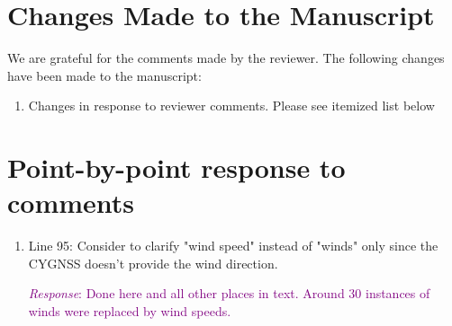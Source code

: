 \documentclass[10pt, letterpaper]{article}
\begin{document}


\section*{Changes Made to the Manuscript}

We are grateful for the comments made by the reviewer. The following changes have been made to the manuscript:

\begin{enumerate}
    \item Changes in response to reviewer comments. Please see itemized list below

\end{enumerate}

\section*{Point-by-point response to comments}

\begin{enumerate}

\item Line 95: Consider to clarify "wind speed" instead of "winds" only since the CYGNSS doesn't provide the wind direction.

 \textcolor{purple}{\emph{Response}: Done here and all other places in text. Around 30 instances of winds were replaced by wind speeds.}

\end{enumerate}
%
\end{document}

